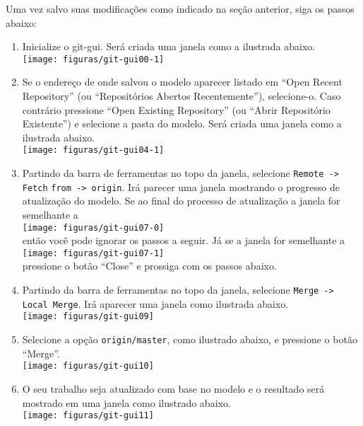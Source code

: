 Uma vez salvo suas modificações como indicado na seção anterior, siga os passos
abaixo:
\begin{enumerate}
  \item Inicialize o git-gui. Será criada uma janela como a ilustrada abaixo.\\
    \texttt{[image: figuras/git-gui00-1]}
  \item Se o endereço de onde salvou o modelo aparecer listado em ``Open Recent
    Repository'' (ou ``Repositórios Abertos Recentemente''), selecione-o. Caso
    contrário pressione ``Open Existing Repository'' (ou ``Abrir Repositório
    Existente'') e selecione a pasta do modelo. Será criada uma janela como a
    ilustrada abaixo.\\
    \texttt{[image: figuras/git-gui04-1]}
  \item Partindo da barra de ferramentas no topo da janela, selecione
    \lstinline+Remote -> Fetch+ \lstinline+from -> origin+. Irá parecer uma janela
    mostrando o progresso de atualização do modelo. Se ao final do processo de
    atualização a janela for semelhante a\\
    \texttt{[image: figuras/git-gui07-0]}\\
    então você pode ignorar os passos a seguir. Já se a janela for semelhante
    a\\
    \texttt{[image: figuras/git-gui07-1]}\\
    pressione o botão ``Close'' e prossiga com os passos abaixo.\\
  \item Partindo da barra de ferramentas no topo da janela, selecione
    \lstinline+Merge -> Local Merge+. Irá aparecer uma janela como ilustrada
    abaixo.\\
    \texttt{[image: figuras/git-gui09]}
  \item Selecione a opção \lstinline+origin/master+, como ilustrado abaixo, e
    pressione o botão ``Merge''.\\
    \texttt{[image: figuras/git-gui10]}
  \item O seu trabalho seja atualizado com base no modelo e o resultado será
    mostrado em uma janela como ilustrado abaixo.\\
    \texttt{[image: figuras/git-gui11]}
\end{enumerate}